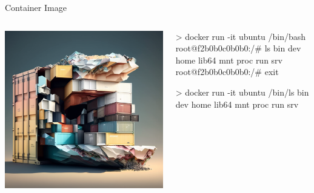 \documentclass{slide}
\begin{document}

\begin{frame}[fragile]{Container Image}
    \begin{columns}
    \begin{column}{0.4\textwidth}
    \begin{center}
    \includegraphics[height=0.8\textheight]{images/container-image}

    \end{center}
    \end{column}
    \begin{column}{0.6\textwidth}
    \begin{code}[numbers=none]{}
> docker run -it ubuntu /bin/bash
root@f2b0b0c0b0b0:/# ls
bin   dev  home  lib64  mnt  proc  run   srv
root@f2b0b0c0b0b0:/# exit
    \end{code}
    \begin{code}[numbers=none]{}
> docker run -it ubuntu /bin/ls
bin   dev  home  lib64  mnt  proc  run   srv
    \end{code}
    \end{column}
    \end{columns}
\end{frame}
\end{document}
